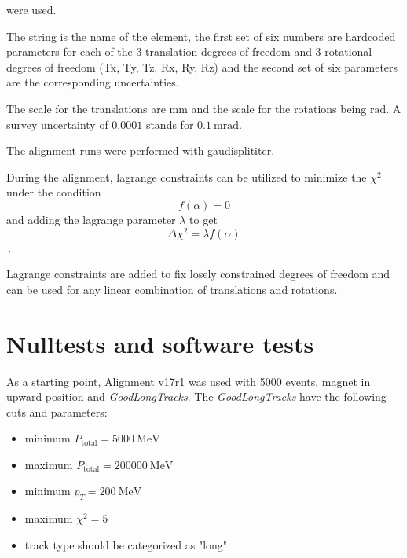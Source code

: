 were used.

The string is the name of the element, the first set of six numbers are hardcoded parameters for each of the 3 translation degrees of freedom and 3 rotational degrees of freedom (Tx, Ty, Tz, Rx, Ry, Rz) and the second set of six parameters are the corresponding uncertainties.

The scale for the translations are $\si{\milli\metre}$ and the scale for the rotations being $\si{\radian}$. A survey uncertainty of $\num{0.0001}$ stands for $\SI{0.1}{\milli\radian}$.

The alignment runs were performed with gaudisplititer.

During the alignment, lagrange constraints can be utilized to minimize the
$\chi^2$ under the condition
\begin{equation}
  f(\alpha) = 0
\end{equation}
and adding the lagrange parameter $\lambda$ to get
\begin{equation}
  \Delta \chi^2 = \lambda f(\alpha)
\end{equation}\,.

Lagrange constraints are added to fix losely constrained degrees of freedom and can be used for any linear combination of translations and rotations.


\section{Nulltests and software tests}

As a starting point, Alignment v17r1 was used with 5000 events, magnet in upward position and \textit{GoodLongTracks}.
The \textit{GoodLongTracks} have the following cuts and parameters:
\begin{itemize}
  \item minimum $P_{\text{total}} = \SI{5000}{\mega\electronvolt}$ %
  \item maximum $P_{\text{total}} = \SI{200000}{\mega\electronvolt}$ %
  \item minimum $p_T = \SI{200}{\mega\electronvolt}$ %
  \item maximum $\chi^2 = 5$
  \item track type should be categorized as "long" %
\end{itemize}

